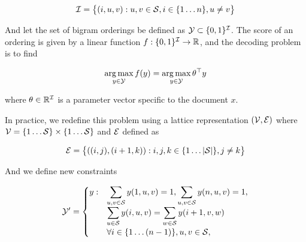 \documentclass[11pt]{article}
\newcommand{\Structs}{{\cal Y}}
\newcommand{\IndexSet}{{\cal I}}
\newcommand{\Sents}{{\cal S}}
\newcommand{\Enum}[1]{\{ 1 \ldots #1 \}}
\newcommand{\Set}[1]{\big\{ #1 \big\}}
\newcommand{\Bin}[1]{\{0,1\}^{#1}}
\newcommand{\Reals}{{\mathbb R}}
\newcommand{\Ver}{{\cal V}}
\newcommand{\Edges}{{\cal E}}
\DeclareMathOperator*{\argmax}{arg\,max}
\begin{document}
\[ \IndexSet = \Set{ (i, u, v) : u, v \in \Sents, i \in \Enum{n}, u \neq v } \]

And let the set of bigram orderings be defined as $\Structs \subset \Bin{\IndexSet}$.
The score of an ordering is given by a linear function  $f:\Bin{\IndexSet} \rightarrow \Reals$, and the decoding problem is to find 

\[\argmax_{y \in \Structs} f(y) = \argmax_{y \in \Structs} \theta^\top y \] 

\noindent where $\theta \in \Reals^{\IndexSet}$ is a parameter vector specific to the document $x$.



 
% 
In practice, we redefine this problem using a lattice representation $(\Ver, \Edges)$ where $\Ver = \Enum{\Sents} \times \Enum{\Sents}$ and $\Edges$ defined as 

\[ {\Edges} = \Set{ ((i, j), (i + 1, k)): i,j,k \in \Enum{|\Sents|}, j \neq k  } \] 
 
And we define new constraints


\[\Structs' = \begin{cases} y : 
& \displaystyle \sum_{u, v\in  \Sents } y(1, u, v)  = 1,  \displaystyle\sum_{u, v \in \Sents } y(n, u, v)  = 1,\\

  & \displaystyle \sum_{u \in \Sents} y(i, u, v) = \sum_{w \in \Sents} y(i+ 1, v, w) \\ \ & \forall i \in \{1\ldots (n-1)\}, u, v \in \Sents, \\
\end{cases} 
\]    
\end{document}
